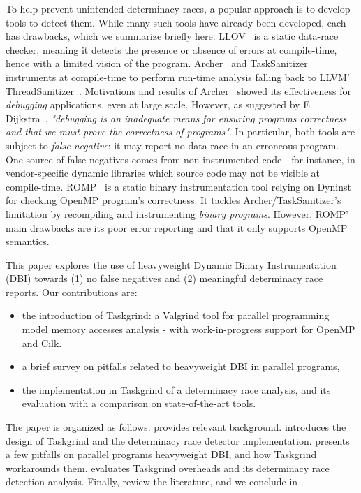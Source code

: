 To help prevent unintended determinacy races, a popular approach is to develop tools to detect them.
While many such tools have already been developed, each has drawbacks, which we summarize briefly here.
LLOV~\cite{LLOV} is a static data-race checker, meaning it detects the presence or absence of errors at compile-time, hence with a limited vision of the program.
Archer~\cite{archer} and TaskSanitizer~\cite{Matar18} instruments at compile-time to perform run-time analysis falling back to LLVM' ThreadSanitizer~\cite{thread-sanitizer-llvm}.
Motivations and results of Archer~\cite{archer} showed its effectiveness for \emph{debugging} applications, even at large scale.
However, as suggested by E. Dijkstra~\cite{EWD303}, \emph{"debugging is an inadequate means for ensuring programs correctness and that we must prove the correctness of programs"}.
In particular, both tools are subject to \emph{false negative}: it may report no data race in an erroneous program. 
One source of false negatives comes from non-instrumented code - for instance, in vendor-specific dynamic libraries which source code may not be visible at compile-time.
ROMP~\cite{ROMP} is a static binary instrumentation tool relying on Dyninst~\cite{dyninstr} for checking OpenMP program's correctness.
It tackles Archer/TaskSanitizer's limitation by recompiling and instrumenting \emph{binary programs}.
However, ROMP' main drawbacks are its poor error reporting and that it only supports OpenMP semantics.

This paper explores the use of heavyweight Dynamic Binary Instrumentation (DBI) towards (1) no false negatives and (2) meaningful determinacy race reports.
Our contributions are:
\begin{itemize}
	\item	the introduction of Taskgrind: a Valgrind tool for parallel programming model memory accesses analysis - with work-in-progress support for OpenMP and Cilk.
	\item 	a brief survey on pitfalls related to heavyweight DBI in parallel programs,
	\item 	the implementation in Taskgrind of a determinacy race analysis, and its evaluation with a comparison on state-of-the-art tools.
\end{itemize}

The paper is organized as follows.
 provides relevant background.
 introduces the design of Taskgrind and the determinacy race detector implementation.
 presents a few pitfalls on parallel programs heavyweight DBI, and how Taskgrind workarounds them.
 evaluates Taskgrind overheads and its determinacy race detection analysis.
Finally,  review the literature, and we conclude in .
